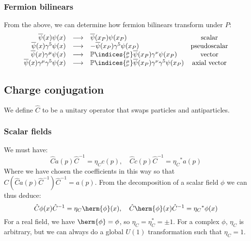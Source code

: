 \documentclass{jknotes}
\begin{document}
\subsubsection*{Fermion bilinears}
From the above, we can determine how fermion bilinears transform under \(P\):
\begin{equation}\begin{array}{rclc}
        \overline{\psi}(x)\psi(x) & \longrightarrow & \overline{\psi}(x_P)\psi(x_P) & \text{scalar}\\
        \overline{\psi}(x)\gamma^5\psi(x) & \longrightarrow & -\overline{\psi}(x_P)\gamma^5\psi(x_P) & \text{pseudoscalar}\\
        \overline{\psi}(x)\gamma^\mu\psi(x) & \longrightarrow & \mathbb{P}\indices{^\mu_\nu} \overline{\psi}(x_P)\gamma^\nu\psi(x_P) & \text{vector}\\
        \overline{\psi}(x)\gamma^\mu\gamma^5\psi(x) & \longrightarrow & \mathbb{P}\indices{^\mu_\nu}\overline{\psi}(x_P)\gamma^\nu\gamma^5\psi(x_P) & \text{axial vector}
\end{array}\end{equation}

\subsection{Charge conjugation}
We define \(\hat{C}\) to be a unitary operator that swaps particles and antiparticles.

\subsubsection*{Scalar fields}
We must have:
\begin{equation}
    \hat{C}a(p)\hat{C}^{-1} = \eta_C c(p)
    ,\quad
    \hat{C}c(p)\hat{C}^{-1} = {\eta_C}^* a(p)
\end{equation}
Where we have chosen the coefficients in this way so that \(\hat{C}(\hat{C}a(p)\hat{C}^{-1})\hat{C}^{-1} = a(p)\). From the decomposition of a scalar field \(\phi\) we can thus deduce:
\begin{equation}
    \hat{C}\phi(x)\hat{C}^{-1} = \eta_C\herm{\phi}(x)
    ,\quad
    \hat{C}\herm{\phi}(x)\hat{C}^{-1} = {\eta_C}^* \phi(x)
\end{equation}
For a real field, we have \(\herm{\phi} = \phi\), so \(\eta_C = \eta_C^* = \pm 1\). For a complex \(\phi\), \(\eta_C\) is arbitrary, but we can always do a global \(U(1)\) transformation such that \(\eta_C = 1\).
\end{document}
